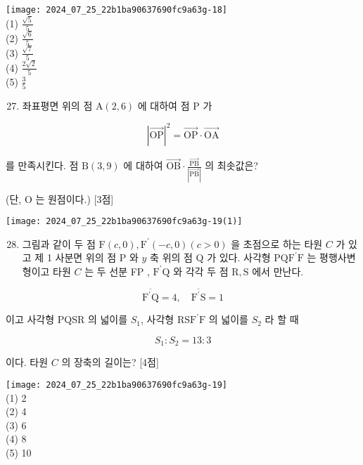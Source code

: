 \documentclass[10pt]{article}
\begin{document}
\texttt{[image: 2024\_07\_25\_22b1ba90637690fc9a63g-18]}\\
(1) $\frac{\sqrt{5}}{5}$\\
(2) $\frac{\sqrt{6}}{5}$\\
(3) $\frac{\sqrt{7}}{5}$\\
(4) $\frac{2 \sqrt{2}}{5}$\\
(5) $\frac{3}{5}$

\begin{enumerate}
  \setcounter{enumi}{26}
  \item 좌표평면 위의 점 $\mathrm{A}(2,6)$ 에 대하여 점 P 가
\end{enumerate}

\[
|\overrightarrow{\mathrm{OP}}|^{2}=\overrightarrow{\mathrm{OP}} \cdot \overrightarrow{\mathrm{OA}}
\]

를 만족시킨다. 점 $\mathrm{B}(3,9)$ 에 대하여 $\overrightarrow{\mathrm{OB}} \cdot \frac{\overrightarrow{\mathrm{PB}}}{|\overrightarrow{\mathrm{PB}}|}$ 의 최솟값은?

(단, O 는 원점이다.) [3점]

\begin{center}
\texttt{[image: 2024\_07\_25\_22b1ba90637690fc9a63g-19(1)]}
\end{center}

\begin{enumerate}
  \setcounter{enumi}{27}
  \item 그림과 같이 두 점 $\mathrm{F}(c, 0), \mathrm{F}^{\prime}(-c, 0)(c>0)$ 을 초점으로 하는 타원 $C$ 가 있고 제 1 사분면 위의 점 P 와 $y$ 축 위의 점 Q 가 있다. 사각형 $\mathrm{PQF}^{\prime} \mathrm{F}$ 는 평행사변형이고 타원 $C$ 는 두 선분 FP , $\mathrm{F}^{\prime} \mathrm{Q}$ 와 각각 두 점 $\mathrm{R}, \mathrm{S}$ 에서 만난다.
\end{enumerate}

\[
\overline{\mathrm{F}^{\prime} \mathrm{Q}}=4, \quad \overline{\mathrm{F}^{\prime} \mathrm{S}}=1
\]

이고 사각형 PQSR 의 넓이를 $S_{1}$, 사각형 $\mathrm{RSF}^{\prime} \mathrm{F}$ 의 넓이를 $S_{2}$ 라 할 때

\[
S_{1}: S_{2}=13: 3
\]

이다. 타원 $C$ 의 장축의 길이는? [4점]

\texttt{[image: 2024\_07\_25\_22b1ba90637690fc9a63g-19]}\\
(1) 2\\
(2) 4\\
(3) 6\\
(4) 8\\
(5) 10
\end{document}
